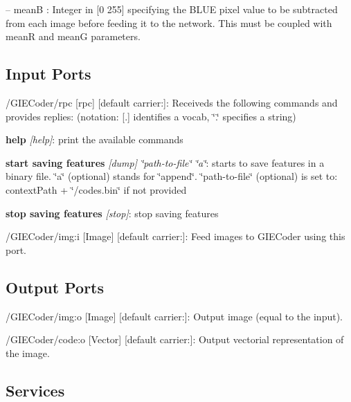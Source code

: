 \begin{DoxyItemize}
\item -- meanB \+: Integer in \mbox{[}0 255\mbox{]} specifying the B\+L\+UE pixel value to be subtracted from each image before feeding it to the network. This must be coupled with {\ttfamily meanR} and {\ttfamily meanG} parameters. 
\end{DoxyItemize}\hypertarget{group__GIECoder_inputports_sec}{}\subsection{Input Ports}\label{group__GIECoder_inputports_sec}

\begin{DoxyItemize}
\item /\+G\+I\+E\+Coder/rpc \mbox{[}rpc\mbox{]} \mbox{[}default carrier\+:\mbox{]}\+: Receiveds the following commands and provides replies\+: (notation\+: \mbox{[}.\mbox{]} identifies a vocab, \char`\"{}.\char`\"{} specifies a string)
\begin{DoxyEnumerate}
\item {\bfseries{help}} {\itshape \mbox{[}help\mbox{]}}\+: print the available commands
\item {\bfseries{start saving features}} {\itshape \mbox{[}dump\mbox{]} \char`\"{}path-\/to-\/file\char`\"{} \char`\"{}a\char`\"{}}\+: starts to save features in a binary file. \char`\"{}a\char`\"{} (optional) stands for \char`\"{}append\char`\"{}. \char`\"{}path-\/to-\/file\char`\"{} (optional) is set to\+: context\+Path + \char`\"{}/codes.\+bin\char`\"{} if not provided
\item {\bfseries{stop saving features}} {\itshape \mbox{[}stop\mbox{]}}\+: stop saving features
\end{DoxyEnumerate}
\item /\+G\+I\+E\+Coder/img\+:i \mbox{[}Image\mbox{]} \mbox{[}default carrier\+:\mbox{]}\+: Feed images to G\+I\+E\+Coder using this port.
\end{DoxyItemize}\hypertarget{group__GIECoder_outputports_sec}{}\subsection{Output Ports}\label{group__GIECoder_outputports_sec}

\begin{DoxyItemize}
\item /\+G\+I\+E\+Coder/img\+:o \mbox{[}Image\mbox{]} \mbox{[}default carrier\+:\mbox{]}\+: Output image (equal to the input).
\item /\+G\+I\+E\+Coder/code\+:o \mbox{[}Vector\mbox{]} \mbox{[}default carrier\+:\mbox{]}\+: Output vectorial representation of the image.
\end{DoxyItemize}\hypertarget{group__GIECoder_services_sec}{}\subsection{Services}\label{group__GIECoder_services_sec}
